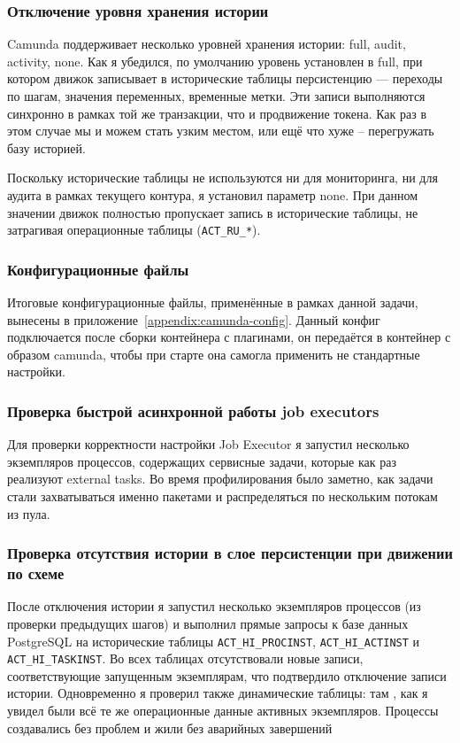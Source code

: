 \subsubsection{Отключение уровня хранения истории}

Camunda поддерживает несколько уровней хранения истории: full, audit, activity, none.
Как я убедился, по умолчанию уровень установлен в full, при котором движок записывает в исторические таблицы персистенцию --- переходы по шагам, значения переменных, временные метки.
Эти записи выполняются синхронно в рамках той же транзакции, что и продвижение токена. Как раз в этом случае мы и можем стать узким местом, или ещё что хуже -- перегружать базу историей.

Поскольку исторические таблицы не используются ни для мониторинга, ни для аудита в рамках текущего контура, я установил параметр none.
При данном значении движок полностью пропускает запись в исторические таблицы, не затрагивая операционные таблицы (\texttt{ACT\_RU\_*}).

\subsubsection{Конфигурационные файлы}

Итоговые конфигурационные файлы, применённые в рамках данной задачи, вынесены в приложение~\ref{appendix:camunda-config}.
Данный конфиг подключается после сборки контейнера с плагинами, он передаётся в контейнер с образом camunda, чтобы при старте она самогла применить не стандартные настройки.

\subsubsection{Проверка быстрой асинхронной работы job executors}

Для проверки корректности настройки Job Executor я запустил несколько экземпляров процессов, содержащих сервисные задачи, которые как раз реализуют external tasks.
Во время профилирования было заметно, как задачи стали захватываться именно пакетами и распределяться по нескольким потокам из пула.

\subsubsection{Проверка отсутствия истории в слое персистенции при движении по схеме}

После отключения истории я запустил несколько экземпляров процессов (из проверки предыдущих шагов) и выполнил прямые запросы к базе данных PostgreSQL на исторические таблицы \texttt{ACT\_HI\_PROCINST}, \texttt{ACT\_HI\_ACTINST} и \texttt{ACT\_HI\_TASKINST}.
Во всех таблицах отсутствовали новые записи, соответствующие запущенным экземплярам, что подтвердило отключение записи истории.
Одновременно я проверил также динамические таблицы: там , как я увидел были всё те же операционные данные активных экземпляров. Процессы создавались без проблем и жили без аварийных завершений

